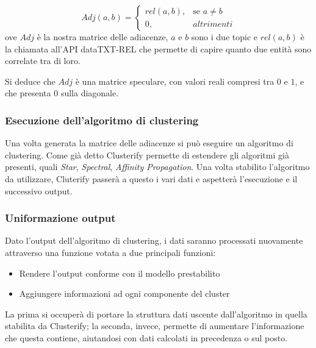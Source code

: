 			\begin{equation*}
				Adj(a, b) = \begin{cases} 
					rel(a,b), & \mbox{se } a \neq b \\ 
					0, & altrimenti 
				\end{cases}
			\end{equation*}
			ove $Adj$ è la nostra matrice delle adiacenze, $a$ e $b$ sono i due topic e $rel(a,b)$ è la chiamata all'API dataTXT-REL che permette di capire quanto due entità sono correlate tra di loro.
			
			Si deduce che $Adj$ è una matrice speculare, con valori reali compresi tra $0$ e $1$, e che presenta $0$ sulla diagonale.

		\subsubsection{Esecuzione dell'algoritmo di clustering}
			Una volta generata la matrice delle adiacenze si può eseguire un algoritmo di clustering. Come già detto Clusterify permette di estendere gli algoritmi già presenti, quali \emph{Star}, \emph{Spectral}, \emph{Affinity Propagation}. Una volta stabilito l'algoritmo da utilizzare, Cluterify passerà a questo i vari dati e aspetterà l'esecuzione e il successivo output.

		\subsubsection{Uniformazione output}
			Dato l'output dell'algoritmo di clustering, i dati saranno processati nuovamente attraverso una funzione votata a due principali funzioni:
			\begin{itemize}
  				\item Rendere l'output conforme con il modello prestabilito
	  			\item Aggiungere informazioni ad ogni componente del cluster
 			\end{itemize} 
			
			La prima si occuperà di portare la struttura dati uscente dall'algoritmo in quella stabilita da Clusterify; la seconda, invece, permette di aumentare l'informazione che questa contiene, aiutandosi con dati calcolati in precedenza o sul posto.




















